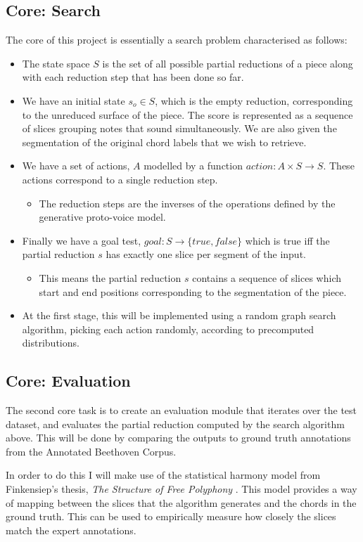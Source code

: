 \documentclass{article}
\begin{document}
\subsection{Core: Search}
The core of this project is essentially a search problem characterised as follows:
\begin{itemize}
  \item The state space $S$ is the set of all possible partial reductions of a piece along with each reduction step that has been done so far. 
  \item We have an initial state $s_o \in S$, which is the empty reduction, corresponding to the unreduced surface of the piece. The score is represented as a sequence of slices grouping notes that sound simultaneously. We are also given the segmentation of the original chord labels that we wish to retrieve.
  \item We have a set of actions, $A$ modelled by a function $action: A \times S \to S$. These actions correspond to a single reduction step.
    \begin{itemize}
      \item The reduction steps are the inverses of the operations defined by the generative proto-voice model.
    \end{itemize}
  \item Finally we have a goal test, $goal: S \to \{true,false\}$ which is true iff the partial reduction $s$ has exactly one slice per segment of the input.
    \begin {itemize}
  \item This means the partial reduction $s$ contains a sequence of slices which start and end positions corresponding to the segmentation of the piece.
    \end {itemize}
  \item At the first stage, this will be implemented using a random graph search algorithm, picking each action randomly, according to precomputed distributions.
\end{itemize}
\par

\subsection{Core: Evaluation}

The second core task is to create an evaluation module that iterates over the test dataset, and evaluates the partial reduction computed by the search algorithm above. This will be done by comparing the outputs to ground truth annotations from the Annotated Beethoven Corpus.
\par
In order to do this I will make use of the statistical harmony model from Finkensiep's thesis, \textit{The Structure of Free Polyphony} \cite{finkensiep_structure_2022}. This model provides a way of mapping between the slices that the algorithm generates and the chords in the ground truth. This can be used to empirically measure how closely the slices match the expert annotations.   
\par
\end{document}
